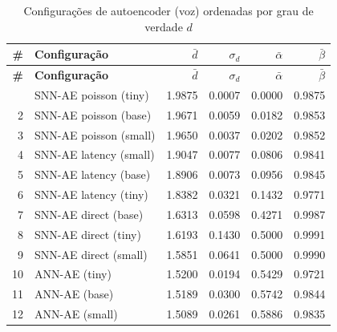 \begin{longtable}{@{}rlrrrr@{}}
\caption{Configurações de autoencoder (voz) ordenadas por grau de verdade $d$} \label{tab:phase00ae_voice} \\
\toprule
\textbf{\#} & \textbf{Configuração} & \textbf{$\bar{d}$} & \textbf{$\sigma_d$} & \textbf{$\bar{\alpha}$} & \textbf{$\bar{\beta}$} \\
\midrule
\endfirsthead
\toprule
\textbf{\#} & \textbf{Configuração} & \textbf{$\bar{d}$} & \textbf{$\sigma_d$} & \textbf{$\bar{\alpha}$} & \textbf{$\bar{\beta}$} \\
\midrule
\endhead
\bottomrule
\endfoot
1 & SNN-AE poisson (tiny) & 1.9875 & 0.0007 & 0.0000 & 0.9875 \\
2 & SNN-AE poisson (base) & 1.9671 & 0.0059 & 0.0182 & 0.9853 \\
3 & SNN-AE poisson (small) & 1.9650 & 0.0037 & 0.0202 & 0.9852 \\
4 & SNN-AE latency (small) & 1.9047 & 0.0077 & 0.0806 & 0.9841 \\
5 & SNN-AE latency (base) & 1.8906 & 0.0073 & 0.0956 & 0.9845 \\
6 & SNN-AE latency (tiny) & 1.8382 & 0.0321 & 0.1432 & 0.9771 \\
7 & SNN-AE direct (base) & 1.6313 & 0.0598 & 0.4271 & 0.9987 \\
8 & SNN-AE direct (tiny) & 1.6193 & 0.1430 & 0.5000 & 0.9991 \\
9 & SNN-AE direct (small) & 1.5851 & 0.0641 & 0.5000 & 0.9990 \\
10 & ANN-AE (tiny) & 1.5200 & 0.0194 & 0.5429 & 0.9721 \\
11 & ANN-AE (base) & 1.5189 & 0.0300 & 0.5742 & 0.9844 \\
12 & ANN-AE (small) & 1.5089 & 0.0261 & 0.5886 & 0.9835 \\
\end{longtable}
